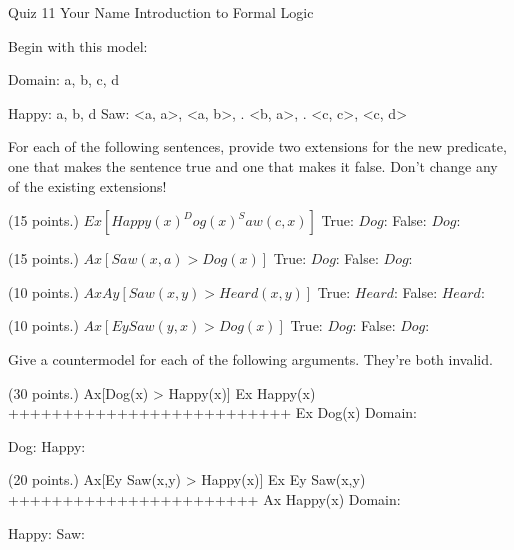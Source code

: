 

\heading
Quiz 11
Your Name
Introduction to Formal Logic
\endheading

Begin with this model:

\answer
        \firstordermodel 
        Domain: a, b, c, d

        Happy:  a, b, d
        Saw:    <a, a>, <a, b>,
           .    <b, a>,
           .    <c, c>, <c, d>
        \endfirstordermodel
\endanswer\bigskip

For each of the following sentences, provide two extensions for the new predicate, one that makes the sentence true and one that makes it false. Don't change any of the existing extensions!

\quantifiers
\problems
{} (15 points.)
$ Ex[Happy(x) ^ Dog(x) ^ Saw(c,x)] $
        \answer
        True: $Dog$: 
        False: $Dog$: 
        \endanswer

 (15 points.)
$ Ax[Saw(x,a) > Dog(x)] $
        \answer
        True: $Dog$: 
        False: $Dog$: 
        \endanswer

 (10 points.)
$ AxAy[Saw(x,y) > Heard(x,y)] $
        \answer\makefomodelangles
        True: $Heard$: 
        False: $Heard$: 
        \endanswer

 (10 points.)
$ Ax[Ey Saw(y,x) > Dog(x)] $
        \answer
        True: $Dog$: 
        False: $Dog$: 
        \endanswer

\endproblems

Give a countermodel for each of the following arguments. They're both invalid.

\problems
{} (30 points.)
\argument
 Ax[Dog(x) > Happy(x)]
 Ex Happy(x)
++++++++++++++++++++++++++
 Ex Dog(x)
\endargument
        \answer
        \firstordermodel
        Domain: 

        Dog:    
        Happy:  
        \endfirstordermodel
        \endanswer

 (20 points.)
\argument
 Ax[Ey Saw(x,y) > Happy(x)]
 Ex Ey Saw(x,y)
+++++++++++++++++++++++
 Ax Happy(x)
\endargument
        \answer
        \firstordermodel
        Domain: 

        Happy:    
        Saw:  
        \endfirstordermodel
        \endanswer

\endproblems
\bye
